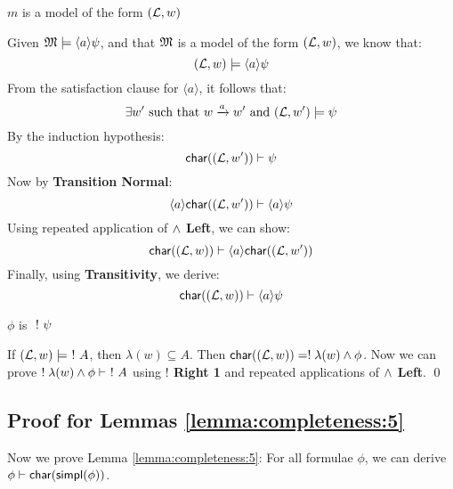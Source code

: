 \begin{subcase}
 $m$ is a  model of the form $(\mathcal{L},w)$
 \end{subcase}
Given $\frak{M} \models \langle a \rangle \psi$, and that $\frak{M}$ is a  model of the form $(\mathcal{L},w)$, we know that:
\[
(\mathcal{L},w) \models \langle a \rangle \psi
\]
From the satisfaction clause for $\langle a \rangle$, it follows that:
\[
\exists w' \mbox{ such that } w \xrightarrow{a} w' \mbox { and } (\mathcal{L},w') \models \psi
\]
By the induction hypothesis:
\[
 \mathsf{char}((\mathcal{L},w')) \vdash \psi
\]
Now by {\bf Transition Normal}:
\[
\langle a \rangle  \mathsf{char}((\mathcal{L},w')) \vdash \langle a \rangle \psi
\]
Using repeated application of {\bf $\land$ Left}, we can show:
\[
 \mathsf{char}((\mathcal{L},w)) \vdash \langle a \rangle  \mathsf{char}((\mathcal{L},w'))
\]
Finally, using {\bf Transitivity}, we derive:
\[
 \mathsf{char}((\mathcal{L},w)) \vdash  \langle a \rangle \psi
\]
\begin{mycase}
$\phi$ is $\ ! \  \psi$
\end{mycase}
If $(\mathcal{L},w) \models \ ! \  A$, then $\lambda(w) \subseteq A$.
Then $ \mathsf{char}((\mathcal{L},w)) = ! \; \lambda(w) \land \phi$.
Now we can prove $! \; \lambda(w) \land \phi \vdash \ ! \  A$ using  {\bf $!$ Right 1} and repeated applications of {\bf $\land$ Left}.
\qed

\subsection{Proof for Lemmas \ref{lemma:completeness:5}}

Now we prove Lemma \ref{lemma:completeness:5}: 
For all formulae $\phi$, we can derive $\phi \vdash \mathsf{char}(\mathsf{simpl}(\phi))$.

